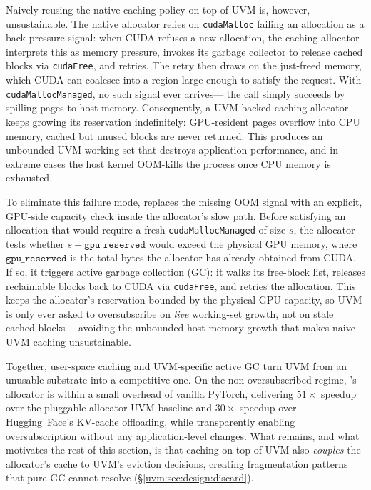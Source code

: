 Naively reusing the native caching policy on top of UVM is, however, unsustainable.
The native allocator relies on \texttt{cudaMalloc} failing an allocation
    as a back-pressure signal:
    when CUDA refuses a new allocation,
    the caching allocator interprets this as memory pressure,
    invokes its garbage collector to release cached blocks via \texttt{cudaFree},
    and retries.
    The retry then draws on the just-freed memory,
    which CUDA can coalesce into a region large enough to satisfy the request.
With \texttt{cudaMallocManaged}, no such signal ever arrives---%
    the call simply succeeds by spilling pages to host memory.
Consequently, a UVM-backed caching allocator
    keeps growing its reservation indefinitely:
    GPU-resident pages overflow into CPU memory,
    cached but unused blocks are never returned.
This produces an unbounded UVM working set that destroys application performance,
    and in extreme cases the host kernel OOM-kills the process
    once CPU memory is exhausted.

To eliminate this failure mode,
    {\uvmname} replaces the missing OOM signal
    with an explicit, GPU-side capacity check
    inside the allocator's slow path.
Before satisfying an allocation that would require
    a fresh \texttt{cudaMallocManaged} of size $s$,
    the allocator tests whether
    $s + \texttt{gpu\_reserved}$ would exceed the physical GPU memory,
    where $\texttt{gpu\_reserved}$ is the total bytes
    the allocator has already obtained from CUDA.
If so, it triggers active garbage collection (GC):
    it walks its free-block list,
    releases reclaimable blocks back to CUDA via \texttt{cudaFree},
    and retries the allocation.
This keeps the allocator's reservation bounded
    by the physical GPU capacity,
    so UVM is only ever asked to oversubscribe
    on \emph{live} working-set growth,
    not on stale cached blocks---%
    avoiding the unbounded host-memory growth
    that makes naive UVM caching unsustainable.

Together, user-space caching and UVM-specific active GC
    turn UVM from an unusable substrate into a competitive one.
On the non-oversubscribed regime,
    {\uvmname}'s allocator is within a small overhead of vanilla PyTorch,
    delivering $51\times$ speedup over the pluggable-allocator UVM baseline
    and $30\times$ speedup over Hugging~Face's KV-cache offloading,
    while transparently enabling oversubscription
    without any application-level changes.
What remains, and what motivates the rest of this section,
    is that caching on top of UVM also \emph{couples} the allocator's cache
    to UVM's eviction decisions,
    creating fragmentation patterns that pure GC cannot resolve
    (\S\ref{uvm:sec:design:discard}).

